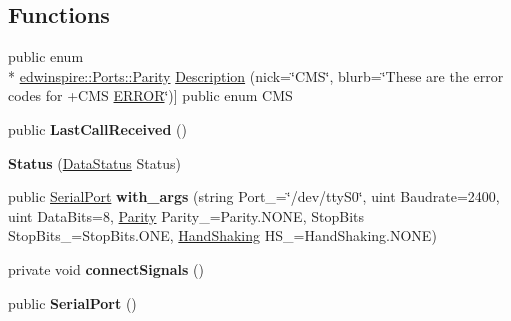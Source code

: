 \subsection*{Functions}
\begin{DoxyCompactItemize}
\item 
public enum \\*
\hyperlink{namespaceedwinspire_1_1_ports_ab404a94ffd8da908dfa277d25f4e5012}{edwinspire\-::\-Ports\-::\-Parity} \hyperlink{namespaceedwinspire_1_1_ports_a3b5ab9c73da132e47d164f322cf54904}{Description} (nick=\char`\"{}C\-M\-S\char`\"{}, blurb=\char`\"{}These are the error codes for +C\-M\-S \hyperlink{namespaceedwinspire_1_1_ports_ac176c111882ba8478fef22b8f15a22b5a9ff899bf11a96eb22b333dd7a2961a72}{E\-R\-R\-O\-R}\char`\"{})\mbox{]} public enum C\-M\-S
\item 
\hypertarget{namespaceedwinspire_1_1_ports_a1cb04d0401c5f2277711b286f3199061}{public {\bfseries Last\-Call\-Received} ()}\label{namespaceedwinspire_1_1_ports_a1cb04d0401c5f2277711b286f3199061}

\item 
\hypertarget{namespaceedwinspire_1_1_ports_a10704194579fb04d8727a79a98d53f3f}{{\bfseries Status} (\hyperlink{namespaceedwinspire_1_1_ports_a8f46ab15ec2741c3e028c5c5ddff36d3}{Data\-Status} Status)}\label{namespaceedwinspire_1_1_ports_a10704194579fb04d8727a79a98d53f3f}

\item 
\hypertarget{namespaceedwinspire_1_1_ports_a9de2452f18841a5338e2c45fbc8cca2d}{public \hyperlink{class_serial_port}{Serial\-Port} {\bfseries with\-\_\-args} (string Port\-\_\-=\char`\"{}/dev/tty\-S0\char`\"{}, uint Baudrate=2400, uint Data\-Bits=8, \hyperlink{namespaceedwinspire_1_1_ports_ab404a94ffd8da908dfa277d25f4e5012}{Parity} Parity\-\_\-=Parity.\-N\-O\-N\-E, Stop\-Bits Stop\-Bits\-\_\-=Stop\-Bits.\-O\-N\-E, \hyperlink{namespaceedwinspire_1_1_ports_afd526aa1ebf856f40b0dfdbef71f7077}{Hand\-Shaking} H\-S\-\_\-=Hand\-Shaking.\-N\-O\-N\-E)}\label{namespaceedwinspire_1_1_ports_a9de2452f18841a5338e2c45fbc8cca2d}

\item 
\hypertarget{namespaceedwinspire_1_1_ports_af8d9afe49636a2f0ba22f1f17bbaba17}{private void {\bfseries connect\-Signals} ()}\label{namespaceedwinspire_1_1_ports_af8d9afe49636a2f0ba22f1f17bbaba17}

\item 
\hypertarget{namespaceedwinspire_1_1_ports_a293ef58b4105463e6bd4b2d5ad9b3144}{public {\bfseries Serial\-Port} ()}\label{namespaceedwinspire_1_1_ports_a293ef58b4105463e6bd4b2d5ad9b3144}


\end{DoxyCompactItemize}
